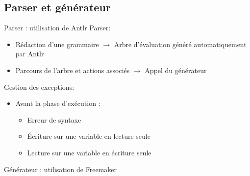 \documentclass{beamer}
\begin{document}
\subsection{Parser et g\'en\'erateur}
\begin{frame}{Parser : utilisation de Antlr}
	Parser: 
	\vspace{-10px}
	\begin{itemize}
		\item Rédaction d'une grammaire \newline
			\footnotesize
			$\rightarrow$ Arbre d'évaluation généré automatiquement par Antlr
			\normalsize
		\item Parcours de l'arbre et actions associés\newline
			$\rightarrow$ Appel du générateur
	\end{itemize}
	\vfill
	\pause
	Gestion des exceptions:
	\vspace{-10px}
	\begin{itemize}
		\item Avant la phase d'exécution : 
			\begin{itemize}
		\item Erreur de syntaxe
		\item Écriture sur une variable en lecture seule
		\item Lecture sur une variable en écriture seule
		\end{itemize}
	\end{itemize}
\end{frame}

\begin{frame}{Générateur : utilisation de Freemaker}
\end{frame}
\end{document}
